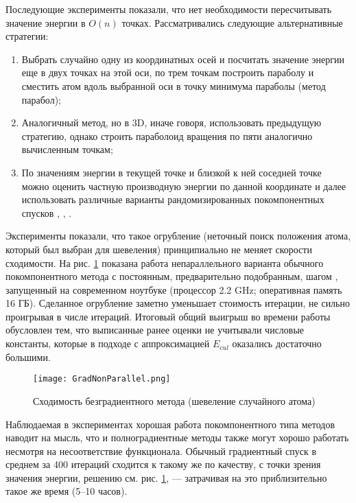   Последующие эксперименты показали, что нет необходимости пересчитывать значение энергии в ${O}\left( n \right)$ точках. Рассматривались следующие альтернативные стратегии: 
  \begin{enumerate}
    \item Выбрать случайно одну из координатных осей и посчитать значение энергии еще в двух точках на этой оси, по трем точкам построить параболу и сместить атом вдоль выбранной оси в точку минимума параболы (метод парабол); 
    \item Аналогичный метод, но в 3D, иначе говоря, использовать предыдущую стратегию, однако строить параболоид вращения по пяти аналогично вычисленным точкам; 
    \item По значениям энергии в текущей точке и близкой к ней соседней точке можно оценить частную производную энергии по данной координате и далее использовать различные варианты рандомизированных покомпонентных спусков \cite{conn2009introduction}, \cite{ghadimi2013stochastic}, \cite{wright2015coordinate}.
  \end{enumerate}
  Эксперименты показали, что такое огрубление (неточный поиск положения атома, который был выбран для шевеления) принципиально не меняет скорости сходимости. На рис. \ref{GF} показана работа непараллельного варианта обычного покомпонентного метода с постоянным, предварительно подобранным, шагом \cite{ghadimi2013stochastic}, запущенный на современном ноутбуке (процессор 2.2 GHz; оперативная память 16 ГБ). Сделанное огрубление заметно уменьшает стоимость итерации, не сильно проигрывая в числе итераций. Итоговый общий выигрыш во времени работы обусловлен тем, что выписанные ранее оценки не учитывали числовые константы, которые в подходе с аппроксимацией $E_{cul}$ оказались достаточно большими. 

  \begin{figure}
  \begin{center}
  \texttt{[image: GradNonParallel.png]}
  \end{center}
  \caption{Сходимость безградиентного метода (шевеление случайного атома)}
   \label{GF}
  \end{figure}

  Наблюдаемая в экспериментах хорошая работа покомпонентного типа методов наводит на мысль, что и полноградиентные методы также могут хорошо работать несмотря на несоответствие функционала. Обычный градиентный спуск в среднем за 400 итераций сходится к такому же по качеству, с точки зрения значения энергии, решению см. рис. \ref{GF}, --- затрачивая на это приблизительно такое же время (5--10 часов). 


